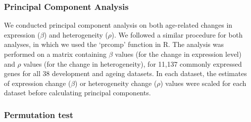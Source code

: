 \documentclass[12pt,twoside]{unicam}
\begin{document}
\hypertarget{principal-component-analysis}{%
\subsubsection{Principal Component Analysis}\label{principal-component-analysis}}

We conducted principal component analysis on both age-related changes in expression (\(\beta\)) and heterogeneity (\(\rho\)). We followed a similar procedure for both analyses, in which we used the `prcomp' function in R. The analysis was performed on a matrix containing \(\beta\) values (for the change in expression level) and \(\rho\) values (for the change in heterogeneity), for 11,137 commonly expressed genes for all 38 development and ageing datasets. In each dataset, the estimates of expression change (\(\beta\)) or heterogeneity change (\(\rho\)) values were scaled for each dataset before calculating principal components.

\hypertarget{permutation-test}{%
\subsubsection{Permutation test}\label{permutation-test}}
\end{document}
